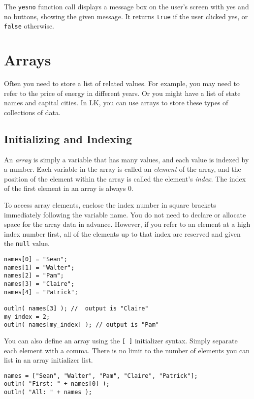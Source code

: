 \documentclass{article}
\begin{document}
The \texttt{yesno} function call displays a message box on the user's screen with yes and no buttons, showing the given message.  It returns \texttt{true} if the user clicked yes, or \texttt{false} otherwise.

\section{Arrays}

Often you need to store a list of related values.  For example, you may need to refer to the price of energy in different years.  Or you might have a list of state names and capital cities.  In LK, you can use arrays to store these types of collections of data.

\subsection{Initializing and Indexing}

An \emph{array} is simply a variable that has many values, and each value is indexed by a number.  Each variable in the array is called an \emph{element} of the array, and the position of the element within the array is called the element's \emph{index}.  The index of the first element in an array is always 0.

To access array elements, enclose the index number in square brackets immediately following the variable name.  You do not need to declare or allocate space for the array data in advance.  However, if you refer to an element at a high index number first, all of the elements up to that index are reserved and given the \texttt{null} value.

\begin{verbatim}
names[0] = "Sean";
names[1] = "Walter";
names[2] = "Pam";
names[3] = "Claire";
names[4] = "Patrick";

outln( names[3] ); //  output is "Claire"
my_index = 2;
outln( names[my_index] ); // output is "Pam"
\end{verbatim}

You can also define an array using the \texttt{[ ]} initializer syntax. Simply separate each element with a comma.  There is no limit to the number of elements you can list in an array initializer list.

\begin{verbatim}
names = ["Sean", "Walter", "Pam", "Claire", "Patrick"];
outln( "First: " + names[0] );
outln( "All: " + names );
\end{verbatim}
\end{document}

